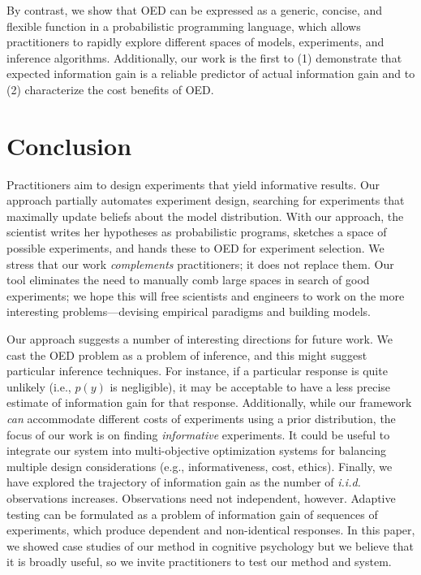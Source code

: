\documentclass{article}
\begin{document}
By contrast, we show that OED can be expressed as a generic, concise, and flexible function in a probabilistic programming language, which allows practitioners to rapidly explore different spaces of models, experiments, and inference algorithms.
Additionally, our work is the first to (1) demonstrate that expected information gain is a reliable predictor of actual information gain and to (2) characterize the cost benefits of OED.

\section{Conclusion}

Practitioners aim to design experiments that yield informative results.
Our approach partially automates experiment design, searching for experiments that maximally update beliefs about the model distribution.
With our approach, the scientist writes her hypotheses as probabilistic programs, sketches a space of possible experiments, and hands these to OED for experiment selection.
We stress that our work \emph{complements} practitioners; it does not replace them.
Our tool eliminates the need to manually comb large spaces in search of good experiments; we hope this will free scientists and engineers to work on the more interesting problems---devising empirical paradigms and building models.

Our approach suggests a number of interesting directions for future work.
We cast the OED problem as a problem of inference, and this might suggest particular inference techniques.
For instance, if a particular response is quite unlikely (i.e., $p(y)$ is negligible), it may be acceptable to have a less precise estimate of information gain for that response.
Additionally, while our framework \emph{can} accommodate different costs of experiments using a prior distribution, the focus of our work is on finding \emph{informative} experiments.
It could be useful to integrate our system into multi-objective optimization systems for balancing multiple design considerations (e.g., informativeness, cost, ethics).
Finally, we have explored the trajectory of information gain as the number of \emph{i.i.d.} observations increases.
Observations need not independent, however.
Adaptive testing can be formulated as a problem of information gain of sequences of experiments, which produce dependent and non-identical responses.
In this paper, we showed case studies of our method in cognitive psychology but we believe that it is broadly useful, so we invite practitioners to test our method and system.



\end{document}
